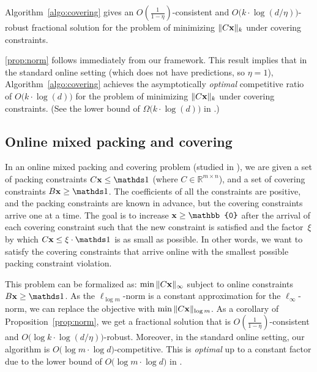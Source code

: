 \begin{proposition}	\label{prop:norm}
Algorithm~\ref{algo:covering} gives an
$O(\frac{1}{1 - \eta})$-consistent and $O\bigl( k \cdot \log (d/\eta)\bigr)$-robust fractional solution
for the problem of minimizing $\|C \mathbf{x}\|_{k}$ under covering constraints.
\end{proposition}

\cref{prop:norm} follows immediately from our framework.
This result implies that in the standard online setting (which does not have predictions, so $\eta = 1$), Algorithm~\ref{algo:covering}
achieves the asymptotically \emph{optimal} competitive ratio of  $O\bigl( k \cdot \log (d)\bigr)$
for the problem of minimizing $\|C \mathbf{x}\|_{k}$ under covering constraints. (See the lower bound
of $\Omega\bigl( k \cdot \log (d)\bigr)$ in \cite{AzarCohen14:Online-Covering}.)


\subsection{Online mixed packing and covering}	\label{appix-mixed}
In an online mixed packing and covering problem (studied in \cite{AzarBhaskar13:Online-mixed}),
we are given a set of packing constraints $C \vect{x} \leq \one$ (where $C \in \mathbb{R}^{m \times n}$),
and a set of covering constraints $B \vect{x} \geq \one$. The coefficients of all the constraints are positive,
and the packing constraints are known in advance, but the covering constraints arrive one at a time.
The goal is to increase $\vect{x} \geq \mathbb{0}$ after the arrival of each covering constraint
such that the new constraint is satisfied and the factor~$\xi$ by which $C \vect{x} \leq \xi \cdot \one$ is as small as possible. In other words, we want to satisfy the covering constraints that arrive online with the smallest possible packing constraint violation.

This problem can be formalized as: $\min \| C \mathbf{x}\|_{\infty}$ subject to online constraints $B \vect{x} \geq \one$.
As the $\ell_{\log m}$-norm is a constant approximation for the $\ell_{\infty}$-norm, we can replace the objective with $\min \| C \mathbf{x}\|_{\log m}$.
As a corollary of Proposition~\ref{prop:norm}, we get a fractional solution that is
$O(\frac{1}{1 - \eta})$-consistent and $O\bigl( \log k \cdot \log (d/\eta)\bigr)$-robust.
Moreover, in the standard online setting, our algorithm is $O\bigl( \log m \cdot \log d \bigr)$-competitive. This is \emph{optimal} up to a constant factor
due to the lower bound of $O\bigl( \log m \cdot \log d \bigr)$ in \cite{AzarBhaskar13:Online-mixed}.



